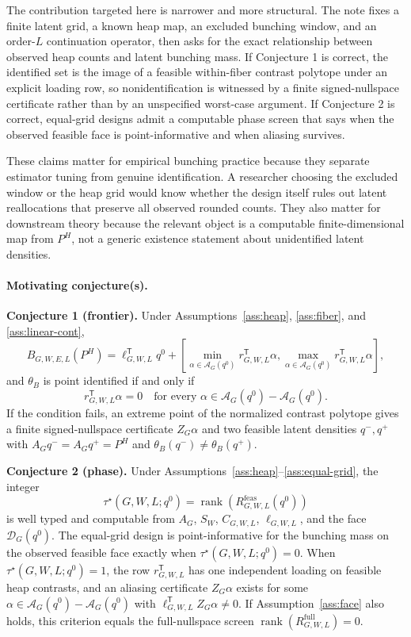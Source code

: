 \documentclass[11pt]{article}
\newcommand{\transpose}{\mathsf{T}}
\theoremstyle{definition}
\theoremstyle{plain}
\theoremstyle{remark}
\begin{document}
The contribution targeted here is narrower and more structural.  The note fixes a finite latent grid, a known heap map, an excluded bunching window, and an order-\(L\) continuation operator, then asks for the exact relationship between observed heap counts and latent bunching mass.  If Conjecture 1 is correct, the identified set is the image of a feasible within-fiber contrast polytope under an explicit loading row, so nonidentification is witnessed by a finite signed-nullspace certificate rather than by an unspecified worst-case argument.  If Conjecture 2 is correct, equal-grid designs admit a computable phase screen that says when the observed feasible face is point-informative and when aliasing survives.

These claims matter for empirical bunching practice because they separate estimator tuning from genuine identification.  A researcher choosing the excluded window or the heap grid would know whether the design itself rules out latent reallocations that preserve all observed rounded counts.  They also matter for downstream theory because the relevant object is a computable finite-dimensional map from \(P^H\), not a generic existence statement about unidentified latent densities.

\paragraph{Motivating conjecture(s).}
\textbf{Conjecture 1 (frontier).} Under Assumptions~\ref{ass:heap}, \ref{ass:fiber}, and \ref{ass:linear-cont},
\[
B_{G,W,E,L}(P^H)=
\ell_{G,W,L}^{\transpose}q^0+
\left[
\min_{\alpha\in\mathcal{A}_G(q^0)} r_{G,W,L}^{\transpose}\alpha,
\max_{\alpha\in\mathcal{A}_G(q^0)} r_{G,W,L}^{\transpose}\alpha
\right],
\]
and \(\theta_B\) is point identified if and only if
\[
r_{G,W,L}^{\transpose}\alpha=0
\quad\text{for every }\alpha\in\mathcal{A}_G(q^0)-\mathcal{A}_G(q^0).
\]
If the condition fails, an extreme point of the normalized contrast polytope gives a finite signed-nullspace certificate \(Z_G\alpha\) and two feasible latent densities \(q^-,q^+\) with \(A_Gq^-=A_Gq^+=P^H\) and \(\theta_B(q^-)\neq\theta_B(q^+)\).

\textbf{Conjecture 2 (phase).} Under Assumptions~\ref{ass:heap}--\ref{ass:equal-grid}, the integer
\[
\tau^\star(G,W,L;q^0)=\operatorname{rank}(R^{\mathrm{feas}}_{G,W,L}(q^0))
\]
is well typed and computable from \(A_G\), \(S_W\), \(C_{G,W,L}\), \(\ell_{G,W,L}\), and the face \(\mathcal{D}_G(q^0)\).  The equal-grid design is point-informative for the bunching mass on the observed feasible face exactly when \(\tau^\star(G,W,L;q^0)=0\).  When \(\tau^\star(G,W,L;q^0)=1\), the row \(r_{G,W,L}^{\transpose}\) has one independent loading on feasible heap contrasts, and an aliasing certificate \(Z_G\alpha\) exists for some \(\alpha\in\mathcal{A}_G(q^0)-\mathcal{A}_G(q^0)\) with \(\ell_{G,W,L}^{\transpose}Z_G\alpha\neq0\).  If Assumption~\ref{ass:face} also holds, this criterion equals the full-nullspace screen \(\operatorname{rank}(R^{\mathrm{full}}_{G,W,L})=0\).
\end{document}
